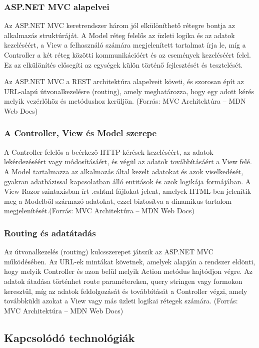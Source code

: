 \subsubsection{ASP.NET MVC alapelvei}

\indent Az ASP.NET MVC keretrendszer három jól elkülöníthető rétegre bontja az alkalmazás struktúráját. A Model réteg felelős az üzleti logika és az adatok kezeléséért, a View a felhasználó számára megjelenített tartalmat írja le, míg a Controller a két réteg közötti kommunikációért és az események kezeléséért felel. Ez az elkülönítés elősegíti az egységek külön történő fejlesztését és tesztelését.

Az ASP.NET MVC a REST architektúra alapelveit követi, és szorosan épít az URL-alapú útvonalkezelésre (routing), amely meghatározza, hogy egy adott kérés melyik vezérlőhöz és metódushoz kerüljön. (Forrás: MVC Architektúra – MDN Web Docs)

\subsubsection{A Controller, View és Model szerepe}

\indent A Controller felelős a beérkező HTTP-kérések kezeléséért, az adatok lekérdezéséért vagy módosításáért, és végül az adatok továbbításáért a View felé. A Model tartalmazza az alkalmazás által kezelt adatokat és azok viselkedését, gyakran adatbázissal kapcsolatban álló entitások és azok logikája formájában. A View Razor szintaxisban írt .cshtml fájlokat jelent, amelyek HTML-ben jelenítik meg a Modelből származó adatokat, ezzel biztosítva a dinamikus tartalom megjelenítését.(Forrás: MVC Architektúra – MDN Web Docs)

\subsubsection{Routing és adatátadás}

\indent Az útvonalkezelés (routing) kulcsszerepet játszik az ASP.NET MVC működésében. Az URL-ek mintákat követnek, amelyek alapján a rendszer eldönti, hogy melyik Controller és azon belül melyik Action metódus hajtódjon végre. Az adatok átadása történhet route paramétereken, query stringen vagy formokon keresztül, míg az adatok feldolgozását és továbbítását a Controller végzi, amely továbbküldi azokat a View vagy más üzleti logikai rétegek számára. (Forrás: MVC Architektúra – MDN Web Docs)


\subsection{Kapcsolódó technológiák}


